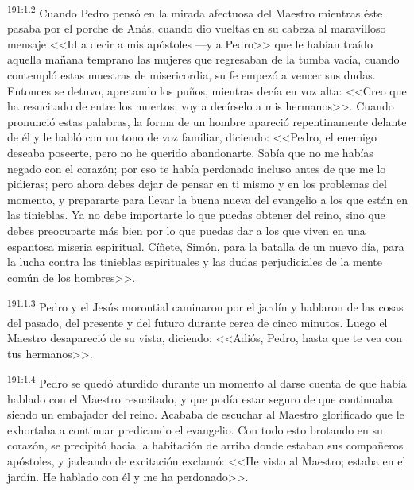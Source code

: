 \par 
\textsuperscript{191:1.2} Cuando Pedro pensó en la mirada afectuosa del Maestro mientras éste pasaba por el porche de Anás, cuando dio vueltas en su cabeza al maravilloso mensaje <<Id a decir a mis apóstoles ---y a Pedro>> que le habían traído aquella mañana temprano las mujeres que regresaban de la tumba vacía, cuando contempló estas muestras de misericordia, su fe empezó a vencer sus dudas. Entonces se detuvo, apretando los puños, mientras decía en voz alta: <<Creo que ha resucitado de entre los muertos; voy a decírselo a mis hermanos>>. Cuando pronunció estas palabras, la forma de un hombre apareció repentinamente delante de él y le habló con un tono de voz familiar, diciendo: <<Pedro, el enemigo deseaba poseerte, pero no he querido abandonarte. Sabía que no me habías negado con el corazón; por eso te había perdonado incluso antes de que me lo pidieras; pero ahora debes dejar de pensar en ti mismo y en los problemas del momento, y prepararte para llevar la buena nueva del evangelio a los que están en las tinieblas. Ya no debe importarte lo que puedas obtener del reino, sino que debes preocuparte más bien por lo que puedas dar a los que viven en una espantosa miseria espiritual. Cíñete, Simón, para la batalla de un nuevo día, para la lucha contra las tinieblas espirituales y las dudas perjudiciales de la mente común de los hombres>>.

\par 
\textsuperscript{191:1.3} Pedro y el Jesús morontial caminaron por el jardín y hablaron de las cosas del pasado, del presente y del futuro durante cerca de cinco minutos. Luego el Maestro desapareció de su vista, diciendo: <<Adiós, Pedro, hasta que te vea con tus hermanos>>.

\par 
\textsuperscript{191:1.4} Pedro se quedó aturdido durante un momento al darse cuenta de que había hablado con el Maestro resucitado, y que podía estar seguro de que continuaba siendo un embajador del reino. Acababa de escuchar al Maestro glorificado que le exhortaba a continuar predicando el evangelio. Con todo esto brotando en su corazón, se precipitó hacia la habitación de arriba donde estaban sus compañeros apóstoles, y jadeando de excitación exclamó: <<He visto al Maestro; estaba en el jardín. He hablado con él y me ha perdonado>>.

